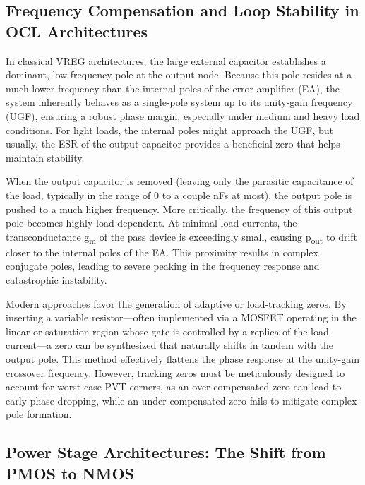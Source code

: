 \documentclass[
]{article}
\begin{document}
\subsection{Frequency Compensation and Loop Stability in OCL
Architectures}\label{_frequency_compensation_and_loop_stability_in_ocl_architectures}

In classical VREG architectures, the large external capacitor
establishes a dominant, low-frequency pole at the output node. Because
this pole resides at a much lower frequency than the internal poles of
the error amplifier (EA), the system inherently behaves as a single-pole
system up to its unity-gain frequency (UGF), ensuring a robust phase
margin, especially under medium and heavy load conditions. For light
loads, the internal poles might approach the UGF, but usually, the ESR
of the output capacitor provides a beneficial zero that helps maintain
stability.

When the output capacitor is removed (leaving only the parasitic
capacitance of the load, typically in the range of 0 to a couple nFs at
most), the output pole is pushed to a much higher frequency. More
critically, the frequency of this output pole becomes highly
load-dependent. At minimal load currents, the transconductance
g\textsubscript{m} of the pass device is exceedingly small, causing
p\textsubscript{out} to drift closer to the internal poles of the EA.
This proximity results in complex conjugate poles, leading to severe
peaking in the frequency response and catastrophic instability.

Modern approaches favor the generation of adaptive or load-tracking
zeros. By inserting a variable resistor---often implemented via a MOSFET
operating in the linear or saturation region whose gate is controlled by
a replica of the load current---a zero can be synthesized that naturally
shifts in tandem with the output pole. This method effectively flattens
the phase response at the unity-gain crossover frequency. However,
tracking zeros must be meticulously designed to account for worst-case
PVT corners, as an over-compensated zero can lead to early phase
dropping, while an under-compensated zero fails to mitigate complex pole
formation.

\subsection{Power Stage Architectures: The Shift from PMOS to
NMOS}\label{_power_stage_architectures_the_shift_from_pmos_to_nmos}
\end{document}
